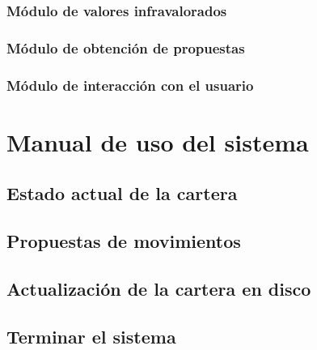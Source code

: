 \documentclass[a4paper, 11pt, titlepage]{article}
\theoremstyle{definition}
\begin{document}
  \subsubsection{Módulo de valores infravalorados}
  \subsubsection{Módulo de obtención de propuestas}
  \subsubsection{Módulo de interacción con el usuario}
  \section{Manual de uso del sistema}
  \subsection{Estado actual de la cartera}
  \subsection{Propuestas de movimientos}
  \subsection{Actualización de la cartera en disco}
  \subsection{Terminar el sistema}
\end{document}
